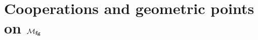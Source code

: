 











\section{Cooperations and geometric points on \texorpdfstring{$\mathcal{M}_{\mathbf{fg}}$}{Mfg}}\label{CoopnsForMoravaKandHA}

